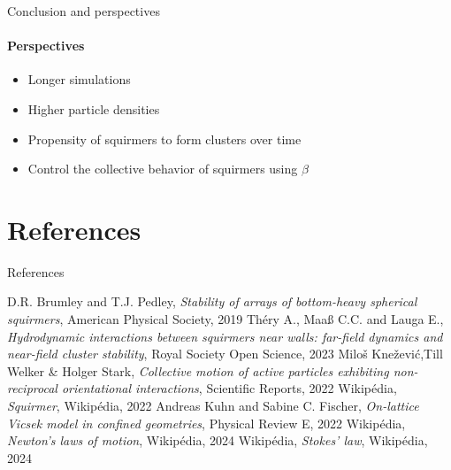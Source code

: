\documentclass{beamer}
\begin{document}
\begin{frame}{Conclusion and perspectives}
    \framesubtitle{Perspectives}
    \begin{center}
        \begin{itemize}
            \item Longer simulations
            \item Higher particle densities
            \item Propensity of squirmers to form clusters over time
            \item Control the collective behavior of squirmers using $\beta$
        \end{itemize}
    \end{center}
\end{frame}

\section{References}
\begin{frame}{References}
    \begin{thebibliography}{}
         D.R. Brumley and T.J. Pedley, \emph{Stability of arrays of bottom-heavy spherical squirmers}, American Physical Society, 2019
         Théry A., Maaß C.C. and Lauga E., \emph{Hydrodynamic interactions between squirmers near walls: far-field dynamics and near-field cluster stability}, Royal Society Open Science, 2023
         Miloš Knežević,Till Welker \& Holger Stark, \emph{Collective motion of active particles exhibiting non-reciprocal orientational interactions}, Scientific Reports, 2022
         Wikipédia, \emph{Squirmer}, Wikipédia, 2022
         Andreas Kuhn and Sabine C. Fischer, \emph{On-lattice Vicsek model in confined geometries}, Physical Review E, 2022
         Wikipédia, \emph{Newton's laws of motion}, Wikipédia, 2024
         Wikipédia, \emph{Stokes' law}, Wikipédia, 2024
    \end{thebibliography}
\end{frame}
\end{document}
